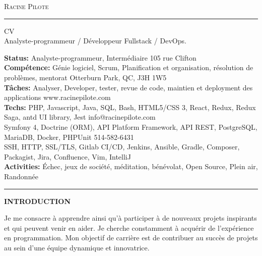 \documentclass[10pt,A4]{article}
\newcommand{\cvsection}[1]
{
	\begin{center}
		\large\textcolor{sectcol}{\textbf{#1}}
	\end{center}
}
\newcommand{\metasection}[2]
{
\footnotesize{#2} \hspace*{\fill} \footnotesize{#1}\\[1pt]
}
\begin{document}
\pagestyle{fancy}


\vspace{-8pt}
\begin{center}
	\HUGE \textsc{Racine Pilote} \textcolor{sectcol}{\rule[-1mm]{1mm}{0.9cm}} \textsc{CV}\\[2pt]
	\small Analyste-programmeur / Développeur Fullstack / DevOps.
\end{center}

\vspace{6pt}


\metasection{105 rue Clifton}{\textbf{Status:} Analyste-programmeur, Intermédiaire}
\metasection{Otterburn Park, QC, J3H 1W5}{\textbf{Compétence:} Génie logiciel, Scrum, Planification et organisation, résolution de problèmes, mentorat}
\metasection{www.racinepilote.com}{\textbf{Tâches:} Analyser, Developer, tester, revue de code, maintien et deployment des applications}
\metasection{info@racinepilote.com}{\textbf{Techs:} PHP, Javascript, Java, SQL, Bash, HTML5/CSS 3, React, Redux, Redux Saga, antd UI library, Jest}
\metasection{514-582-6431}{Symfony 4, Doctrine (ORM), API Platform Framework, API REST, PostgreSQL, MariaDB, Docker, PHPUnit}
\metasection{}{SSH, HTTP, SSL/TLS, Gitlab CI/CD, Jenkins, Ansible, Gradle, Composer, Packagist, Jira, Confluence, Vim, IntelliJ}
\metasection{}{\textbf{Activities:} Échec, jeux de société, méditation, bénévolat, Open Source, Plein air, Randonnée}
\vspace{-2pt}
\textcolor{softcol}{\hrule}
\vspace{6pt}

\normalsize

\vspace{-6pt}

\cvsection{INTRODUCTION}
Je me consacre à apprendre ainsi qu’à participer à de nouveaux projets inspirants et qui peuvent venir en aider.
Je cherche constamment à acquérir de l’expérience en programmation.
Mon objectif de carrière est de contribuer au succès de projets au sein d’une équipe dynamique et innovatrice.
\end{document}
